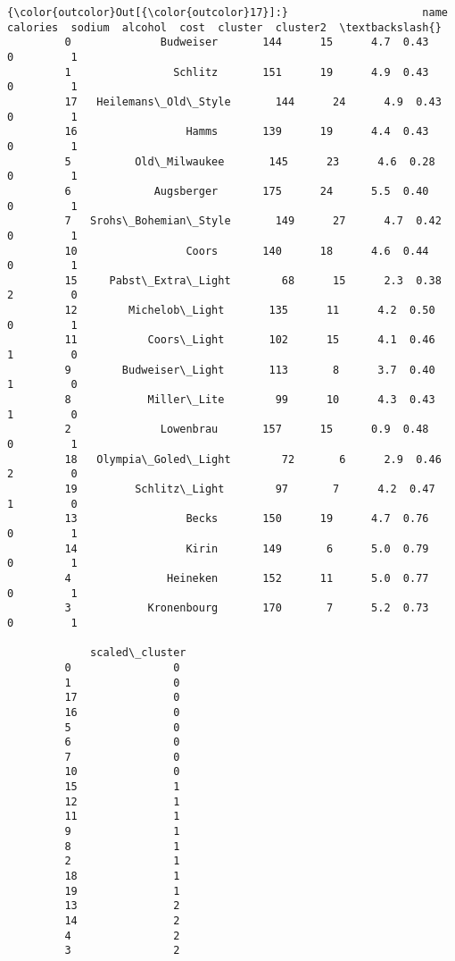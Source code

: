 \documentclass[11pt]{article}
\begin{document}
\begin{Verbatim}[commandchars=\\\{\}]
{\color{outcolor}Out[{\color{outcolor}17}]:}                     name  calories  sodium  alcohol  cost  cluster  cluster2  \textbackslash{}
         0              Budweiser       144      15      4.7  0.43        0         1   
         1                Schlitz       151      19      4.9  0.43        0         1   
         17   Heilemans\_Old\_Style       144      24      4.9  0.43        0         1   
         16                 Hamms       139      19      4.4  0.43        0         1   
         5          Old\_Milwaukee       145      23      4.6  0.28        0         1   
         6             Augsberger       175      24      5.5  0.40        0         1   
         7   Srohs\_Bohemian\_Style       149      27      4.7  0.42        0         1   
         10                 Coors       140      18      4.6  0.44        0         1   
         15     Pabst\_Extra\_Light        68      15      2.3  0.38        2         0   
         12        Michelob\_Light       135      11      4.2  0.50        0         1   
         11           Coors\_Light       102      15      4.1  0.46        1         0   
         9        Budweiser\_Light       113       8      3.7  0.40        1         0   
         8            Miller\_Lite        99      10      4.3  0.43        1         0   
         2              Lowenbrau       157      15      0.9  0.48        0         1   
         18   Olympia\_Goled\_Light        72       6      2.9  0.46        2         0   
         19         Schlitz\_Light        97       7      4.2  0.47        1         0   
         13                 Becks       150      19      4.7  0.76        0         1   
         14                 Kirin       149       6      5.0  0.79        0         1   
         4               Heineken       152      11      5.0  0.77        0         1   
         3            Kronenbourg       170       7      5.2  0.73        0         1   
         
             scaled\_cluster  
         0                0  
         1                0  
         17               0  
         16               0  
         5                0  
         6                0  
         7                0  
         10               0  
         15               1  
         12               1  
         11               1  
         9                1  
         8                1  
         2                1  
         18               1  
         19               1  
         13               2  
         14               2  
         4                2  
         3                2  
\end{Verbatim}
            
\end{document}
